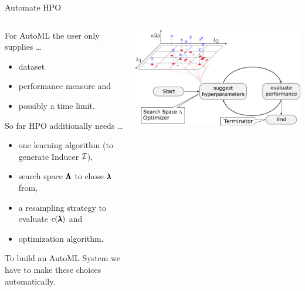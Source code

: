 \begin{frame}{Automate HPO}

  \begin{columns}
    \begin{column}{0.59\textwidth}

      For AutoML the user only supplies \ldots
      \begin{itemize}
        \item dataset
        \item performance measure and
        \item possibly a time limit.
      \end{itemize}

      So far HPO additionally needs \ldots
      \begin{itemize}
        \item one learning algorithm (to generate Inducer $\mathcal{I}$),
        \item search space $\pmb{\Lambda}$ to chose $\pmb{\lambda}$ from,
        \item a resampling strategy to evaluate $c(\pmb{\lambda})$ and
        \item optimization algorithm.
      \end{itemize}

      To build an AutoML System we have to make these choices automatically.

    \end{column}%
    \begin{column}{0.4\textwidth}
      \begin{center}
        \includegraphics[width = \linewidth]{images/tuning.pdf}    
      \end{center}
    \end{column}
  \end{columns}

\end{frame}

